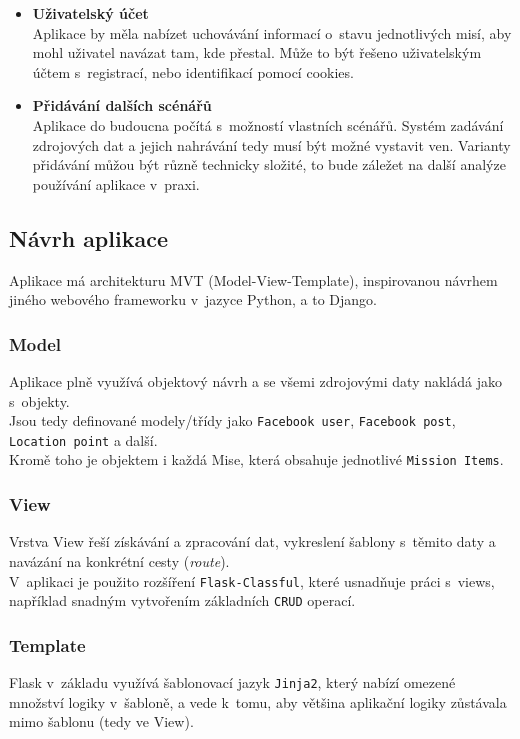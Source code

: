 \begin{itemize}
	\item \textbf{Uživatelský účet}\\
		Aplikace by měla nabízet uchovávání informací o~stavu jednotlivých misí, aby mohl uživatel navázat tam, kde přestal.
		Může to být řešeno uživatelským účtem s~registrací, nebo identifikací pomocí cookies.

	\item \textbf{Přidávání dalších scénářů}\\
		Aplikace do budoucna počítá s~možností vlastních scénářů. Systém zadávání zdrojových dat a jejich nahrávání tedy musí být možné vystavit ven.
		Varianty přidávání můžou být různě technicky složité, to bude záležet na další analýze používání aplikace v~praxi.		


\end{itemize} 

\subsection{Návrh aplikace}
Aplikace má architekturu MVT (Model-View-Template), inspirovanou návrhem jiného webového frameworku v~jazyce Python, a to Django.

\subsubsection*{Model}
Aplikace plně využívá objektový návrh a se všemi zdrojovými daty nakládá jako s~objekty.\\
Jsou tedy definované modely/třídy jako \verb|Facebook user|, \verb|Facebook post|, \verb|Location point| a další.\\
Kromě toho je objektem i každá Mise, která obsahuje jednotlivé \verb|Mission Items|.

\subsubsection*{View}
Vrstva View řeší získávání a zpracování dat, vykreslení šablony s~těmito daty a navázání na konkrétní cesty (\textit{route}).\\
V~aplikaci je použito rozšíření \verb|Flask-Classful|, které usnadňuje práci s~views, například snadným vytvořením základních \verb|CRUD| operací.

\subsubsection*{Template}
Flask v~základu využívá šablonovací jazyk \verb|Jinja2|, který nabízí omezené množství logiky v~šabloně, a vede k~tomu, aby většina aplikační logiky zůstávala mimo šablonu (tedy ve View).

